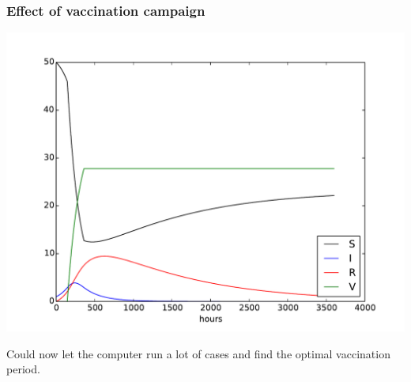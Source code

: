 \documentclass{beamer}
\begin{document}
\begin{frame}
\frametitle{Effect of vaccination campaign}

\begin{center}  %
  \centerline{\includegraphics[width=0.8\linewidth]{fig/SIRV2.pdf}}
\end{center}


Could now let the computer run a lot of cases and find the optimal
vaccination period.
\end{frame}
\end{document}
